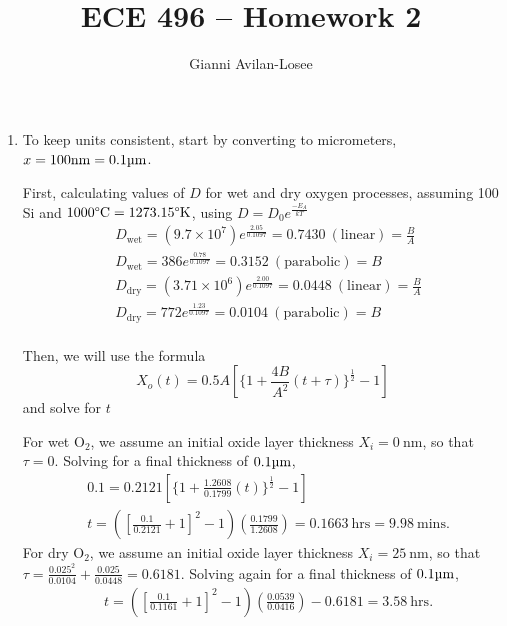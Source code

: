 \documentclass{article}
\title{ECE 496 -- Homework 2}
\author{Gianni Avilan-Losee}
\begin{document}
\setcounter{section}{3}
\setcounter{subsection}{1}
\begin{enumerate}[label=\thesubsection]
	\item To keep units consistent, start by converting to micrometers, \(x=100\mathrm{nm} = 0.1\micro\mathrm{m}\). 

		First, calculating values of \(D\) for wet and dry oxygen processes, assuming 100 Si and \(1000\degree\mathrm{C} = 1273.15\degree\mathrm{K}\), using \(D = D_0e^{\frac{-E_A}{kT}}\)
		\begin{align*}
			&D_{\mathrm{wet}} = (9.7 \times 10^7)e^{\frac{2.05}{0.1097}} = 0.7430 \ \mathrm{(linear)} = \frac{B}{A} \\
			&D_{\mathrm{wet}} = 386e^{\frac{0.78}{0.1097}} = 0.3152 \ \mathrm{(parabolic)} = B \\
			&D_{\mathrm{dry}} = (3.71 \times 10^6)e^{\frac{2.00}{0.1097}} = 0.0448 \ \mathrm{(linear)} = \frac{B}{A} \\
			&D_{\mathrm{dry}} = 772e^{\frac{1.23}{0.1097}} = 0.0104 \ \mathrm{(parabolic)} = B \\
	  \end{align*}

		Then, we will use the formula 
		\[
			X_o(t) = 0.5A[\{1+\frac{4B}{A^2}(t+\tau)\}^\frac{1}{2}-1]
		\]
		and solve for \(t\)

		For wet \(\mathrm{O_2}\), we assume an initial oxide layer thickness \(X_i = 0 \ \mathrm{nm}\), so that \(\tau = 0\). Solving for a final thickness of \(0.1\micro\mathrm{m}\),
		\begin{align*}
			&0.1 = 0.2121[\{1+\frac{1.2608}{0.1799}(t)\}^{\frac{1}{2}}-1] \\
			&t = ([\frac{0.1}{0.2121} + 1]^2 - 1)(\frac{0.1799}{1.2608}) = 0.1663 \ \mathrm{hrs} = 9.98 \ \mathrm{mins}.
		\end{align*}
		For dry \(\mathrm{O_2}\), we assume an initial oxide layer thickness \(X_i = 25 \ \mathrm{nm}\), so that \(\tau = \frac{0.025^2}{0.0104} + \frac{0.025}{0.0448} = 0.6181\). Solving again for a final thickness of \(0.1 \micro\mathrm{m}\), 
		\begin{align*}
			&t = ([\frac{0.1}{0.1161} + 1]^2 - 1)(\frac{0.0539}{0.0416}) - 0.6181 = 3.58 \ \mathrm{hrs}. 
		\end{align*} 
		

\end{enumerate}
\end{document}
